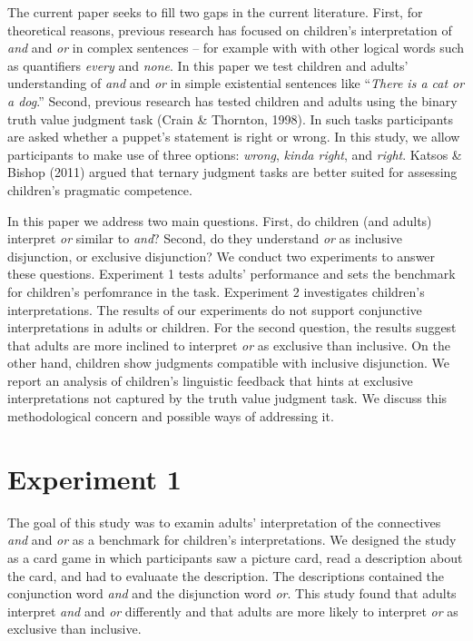 \documentclass[10pt, letterpaper]{article}
\begin{document}
The current paper seeks to fill two gaps in the current literature.
First, for theoretical reasons, previous research has focused on
children's interpretation of \emph{and} and \emph{or} in complex
sentences -- for example with with other logical words such as
quantifiers \emph{every} and \emph{none}. In this paper we test children
and adults' understanding of \emph{and} and \emph{or} in simple
existential sentences like ``\emph{There is a cat or a dog}.'' Second,
previous research has tested children and adults using the binary truth
value judgment task (Crain \& Thornton, 1998). In such tasks
participants are asked whether a puppet's statement is right or wrong.
In this study, we allow participants to make use of three options:
\emph{wrong}, \emph{kinda right}, and \emph{right}. Katsos \& Bishop
(2011) argued that ternary judgment tasks are better suited for
assessing children's pragmatic competence.

In this paper we address two main questions. First, do children (and
adults) interpret \emph{or} similar to \emph{and}? Second, do they
understand \emph{or} as inclusive disjunction, or exclusive disjunction?
We conduct two experiments to answer these questions. Experiment 1 tests
adults' performance and sets the benchmark for children's perfomrance in
the task. Experiment 2 investigates children's interpretations. The
results of our experiments do not support conjunctive interpretations in
adults or children. For the second question, the results suggest that
adults are more inclined to interpret \emph{or} as exclusive than
inclusive. On the other hand, children show judgments compatible with
inclusive disjunction. We report an analysis of children's linguistic
feedback that hints at exclusive interpretations not captured by the
truth value judgment task. We discuss this methodological concern and
possible ways of addressing it.

\section{Experiment 1}\label{experiment-1}

The goal of this study was to examin adults' interpretation of the
connectives \emph{and} and \emph{or} as a benchmark for children's
interpretations. We designed the study as a card game in which
participants saw a picture card, read a description about the card, and
had to evaluaate the description. The descriptions contained the
conjunction word \emph{and} and the disjunction word \emph{or}. This
study found that adults interpret \emph{and} and \emph{or} differently
and that adults are more likely to interpret \emph{or} as exclusive than
inclusive.
\end{document}
